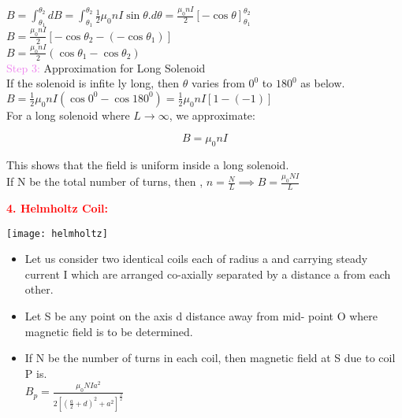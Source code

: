 \documentclass{beamer}
\begin{document}
\begin{frame}
$ B = \int_{\theta_1}^{\theta_2}dB  =\int_{\theta_1}^{\theta_2} \frac{1}{2}\mu_0 nI\sin\theta.d\theta=\frac{\mu_0 nI}{2}[-\cos\theta]_{\theta_1}^{\theta_2}$\\

 \hspace{1cm} $B=\frac{\mu_0 nI}{2}[-\cos\theta_2-(-\cos\theta_1)]$\\
 \hspace{1cm} $B=\frac{\mu_0 nI}{2}(\cos\theta_1-\cos\theta_2)$\\
 
    
\textcolor{violet}{Step 3:} Approximation for Long Solenoid\\

If the solenoid is infite ly long, then $\theta$ varies from $0^0$ to $180^0$ as below.\\
 \hspace{2cm} $B=\frac{1}{2}\mu_0 nI (\cos 0^0-\cos 180^0)=\frac{1}{2}\mu_0 nI[1-(-1)]$\\

For a long solenoid where $L \to \infty$, we approximate:

\begin{equation}
    B = \mu_0 n I
	\end{equation}
	
This shows that the field is uniform inside a long solenoid.\\

If N be the total number of turns, then , $n=\frac{N}{L} \implies B=\frac{\mu_0NI}{L} $
\end{frame}

\begin{frame}
\textcolor{red}{\textbf{4. Helmholtz Coil:}}\\
\begin{center}
\texttt{[image: helmholtz]}
\end{center}
\begin{itemize}
\item Let us consider two identical coils each of radius a and carrying steady current I which are arranged co-axially separated by a distance a from each other.
\item Let S be any point on the axis d distance away from mid-
point O where magnetic field is to be determined.
\item If N be the number of turns in each coil, then magnetic field at S due to coil P is.\\
\hspace{2cm} $B_p=\frac{\mu_0NIa^2}{2[(\frac{a}{2}+d)^2+a^2]^{\frac{3}{2}}}$\\

\end{itemize}
\end{frame}
\end{document}
